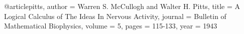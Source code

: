 @article{pitts, 
author = {Warren S. McCullogh and Walter H. Pitts},
title = {{A Logical Calculus of The Ideas In Nervous Activity}},
journal = {Bulletin of Mathematical Biophysics},
volume = {5}, 
pages = {115-133},
year = {1943}
}

